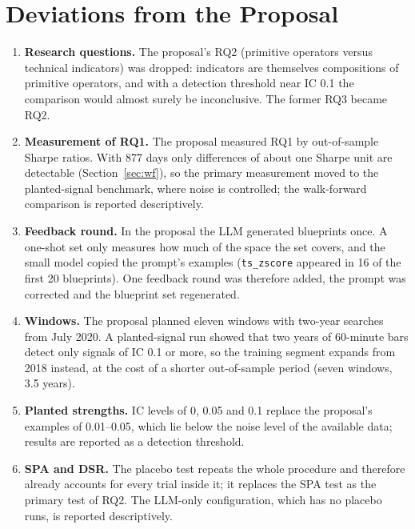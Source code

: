 \documentclass[12pt,a4paper,oneside]{book}
\theoremstyle{definition}
\newcommand{\code}[1]{\texttt{#1}}
\newif\ifdsr
\begin{document}
\section{Deviations from the Proposal}
\label{sec:deviations}

\begin{enumerate}
  \item \textbf{Research questions.} The proposal's RQ2 (primitive operators versus technical indicators) was dropped: indicators are themselves compositions of primitive operators, and with a detection threshold near IC 0.1 the comparison would almost surely be inconclusive. The former RQ3 became RQ2.
  \item \textbf{Measurement of RQ1.} The proposal measured RQ1 by out-of-sample Sharpe ratios. With 877 days only differences of about one Sharpe unit are detectable (Section~\ref{sec:wf}), so the primary measurement moved to the planted-signal benchmark, where noise is controlled; the walk-forward comparison is reported descriptively.
  \item \textbf{Feedback round.} In the proposal the LLM generated blueprints once. A one-shot set only measures how much of the space the set covers, and the small model copied the prompt's examples (\code{ts\_zscore} appeared in 16 of the first 20 blueprints). One feedback round was therefore added, the prompt was corrected and the blueprint set regenerated.
  \item \textbf{Windows.} The proposal planned eleven windows with two-year searches from July 2020. A planted-signal run showed that two years of 60-minute bars detect only signals of IC 0.1 or more, so the training segment expands from 2018 instead, at the cost of a shorter out-of-sample period (seven windows, 3.5 years).
  \item \textbf{Planted strengths.} IC levels of 0, 0.05 and 0.1 replace the proposal's examples of 0.01--0.05, which lie below the noise level of the available data; results are reported as a detection threshold.
  \item \textbf{SPA and DSR.} The placebo test repeats the whole procedure and therefore already accounts for every trial inside it; it replaces the SPA test as the primary test of RQ2. \ifdsr The Deflated Sharpe Ratio is reported as a supplement (Section~\ref{sec:dsr}).\else The LLM-only configuration, which has no placebo runs, is reported descriptively.\fi
\end{enumerate}

\end{document}
